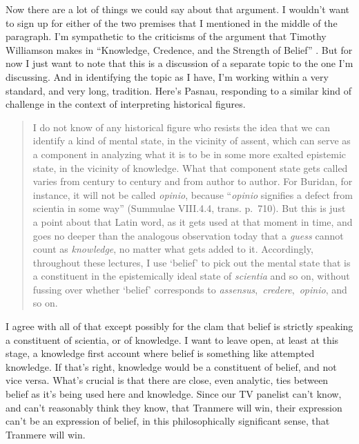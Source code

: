 \documentclass[
  11pt,
]{book}
\begin{document}
Now there are a lot of things we could say about that argument. I wouldn't want to sign up for either of the two premises that I mentioned in the middle of the paragraph. I'm sympathetic to the criticisms of the argument that Timothy Williamson makes in ``Knowledge, Credence, and the Strength of Belief'' \citep{Williamson2022}. But for now I just want to note that this is a discussion of a separate topic to the one I'm discussing. And in identifying the topic as I have, I'm working within a very standard, and very long, tradition. Here's Pasnau, responding to a similar kind of challenge in the context of interpreting historical figures.

\begin{quote}
I do not know of any historical figure who resists the idea that we can identify a kind of mental state, in the vicinity of assent, which can serve as a component in analyzing what it is to be in some more exalted epistemic state, in the vicinity of knowledge. What that component state gets called varies from century to century and from author to author. For Buridan, for instance, it will not be called \emph{opinio}, because ``\emph{opinio} signifies a defect from scientia in some way'' (Summulae VIII.4.4, trans. p.~710). But this is just a point about that Latin word, as it gets used at that moment in time, and goes no deeper than the analogous observation today that a \emph{guess} cannot count as \emph{knowledge}, no matter what gets added to it. Accordingly, throughout these lectures, I use `belief' to pick out the mental state that is a constituent in the epistemically ideal state of \emph{scientia} and so on, without fussing over whether `belief' corresponds to \emph{assensus},~\emph{credere},~\emph{opinio}, and so on. \citep[219]{Pasnau2017}
\end{quote}

I agree with all of that except possibly for the clam that belief is strictly speaking a constituent of scientia, or of knowledge. I want to leave open, at least at this stage, a knowledge first account where belief is something like attempted knowledge. If that's right, knowledge would be a constituent of belief, and not vice versa. What's crucial is that there are close, even analytic, ties between belief as it's being used here and knowledge. Since our TV panelist can't know, and can't reasonably think they know, that Tranmere will win, their expression can't be an expression of belief, in this philosophically significant sense, that Tranmere will win.
\end{document}
